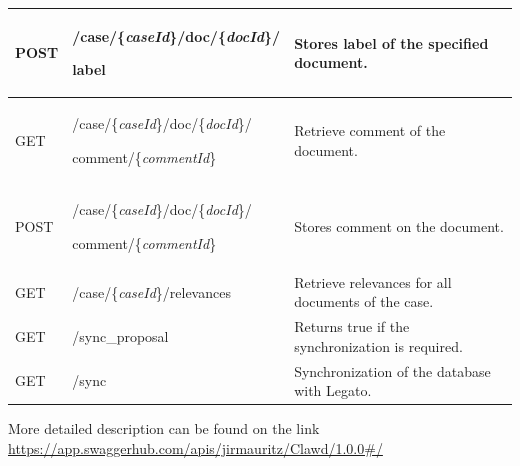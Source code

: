 \documentclass[
  digital, %
  notable,   %
  nolof,     %
  nolot,     %
]{fithesis3}
\begin{document}
\begin{tabularx}{13.6cm}{|m{2cm}|m{5.3cm}|m{5cm}|}
POST  & /case/\{\textit{caseId}\}/doc/\{\textit{docId}\}/\par label & Stores label of the specified document. \\ \hline
GET  & /case/\{\textit{caseId}\}/doc/\{\textit{docId}\}/\par comment/\{\textit{commentId}\} & Retrieve comment of the document. \\ \hline
POST  & /case/\{\textit{caseId}\}/doc/\{\textit{docId}\}/\par comment/\{\textit{commentId}\} & Stores comment on the document. \\ \hline
GET  & /case/\{\textit{caseId}\}/relevances & Retrieve relevances for all documents of the case. \\ \hline
GET  & /sync\_proposal & Returns true if the synchronization is required. \\ \hline
GET  & /sync & Synchronization of the database with Legato. \\ \hline
\end{tabularx}
More detailed description can be found on the link \url{https://app.swaggerhub.com/apis/jirmauritz/Clawd/1.0.0#/}
\end{document}
